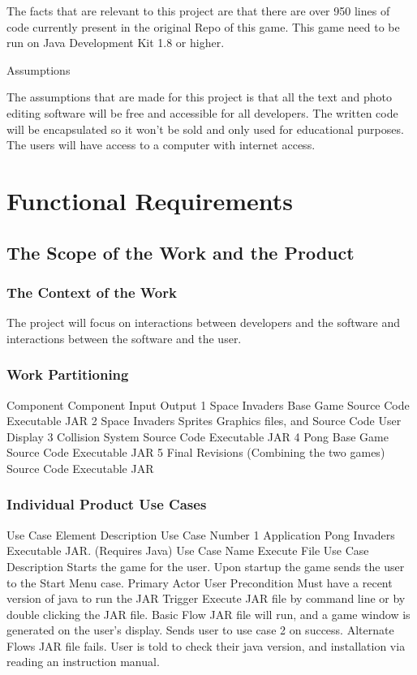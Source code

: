 \documentclass[12pt, titlepage]{article}
\begin{document}
The facts that are relevant to this project are that there are over 950 lines of code currently present in the original Repo of this game. This game need to be run on Java Development Kit 1.8 or higher.

Assumptions

The assumptions that are made for this project  is that all the text and photo editing software will be free and accessible for all developers. The written code will be encapsulated so it won’t be sold and only used for educational purposes. The users will have access to a computer with internet access. 

\section{Functional Requirements}
\subsection{The Scope of the Work and the Product}
\subsubsection{The Context of the Work}
The project will focus on interactions between developers and the software and interactions between the software and the user.

\subsubsection{Work Partitioning}

Component 
Component
Input
Output
1
Space Invaders Base Game
Source Code
Executable JAR
2
Space Invaders Sprites
Graphics files, and Source Code
User Display
3
Collision System
Source Code
Executable JAR
4
Pong Base Game
Source Code
Executable JAR
5
Final Revisions (Combining the two games)
Source Code
Executable JAR

\subsubsection{Individual Product Use Cases}
Use Case Element
Description
Use Case Number
1
Application
Pong Invaders Executable JAR. (Requires Java)
Use Case Name
Execute File
Use Case Description
Starts the game for the user. Upon startup the game sends the user to the Start Menu case.
Primary Actor
User 
Precondition
Must have a recent version of java to run the JAR
Trigger
Execute JAR file by command line or by double clicking the JAR file.
Basic Flow
JAR file will run, and a game window is generated on the user’s display. Sends user to use case 2 on success.
Alternate Flows
JAR file fails. User is told to check their java version, and installation via reading an instruction manual.
\end{document}

